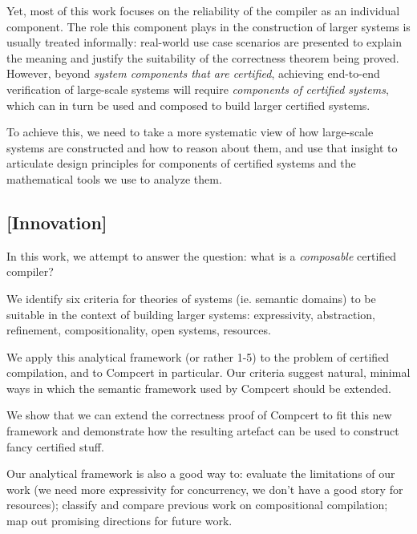 \documentclass[acmsmall,10pt,review,anonymous]{acmart}
\begin{document}
Yet, most of this work
focuses on the reliability of the compiler
as an individual component.
The role this component plays in the construction of larger systems
is usually treated informally:
real-world use case scenarios are presented
to explain the meaning and justify the suitability
of the correctness theorem being proved.
However,
beyond \emph{system components that are certified},
achieving end-to-end verification of large-scale systems
will require \emph{components of certified systems},
which can in turn be used and composed
to build larger certified systems.

To achieve this, we need to take
a more systematic view of
how large-scale systems are constructed and
how to reason about them,
and use that insight to
articulate design principles for
components of certified systems
and the mathematical tools we use to analyze them.

\subsection{[Innovation]}

In this work, we attempt to answer the question:
what is a \emph{composable} certified compiler?

We identify six criteria for theories of systems (ie. semantic domains)
to be suitable in the context of building larger systems:
expressivity, abstraction, refinement,
compositionality, open systems, resources.

We apply this analytical framework (or rather 1-5)
to the problem of certified compilation,
and to Compcert in particular.
Our criteria suggest natural,
minimal ways in which the semantic framework
used by Compcert should be extended.

We show that we can extend the correctness proof of Compcert
to fit this new framework and
demonstrate how the resulting artefact
can be used to construct fancy certified stuff.

Our analytical framework is also a good way to:
evaluate the limitations of our work
(we need more expressivity for concurrency,
we don't have a good story for resources);
classify and compare previous work on compositional compilation;
map out promising directions for future work.
\end{document}
